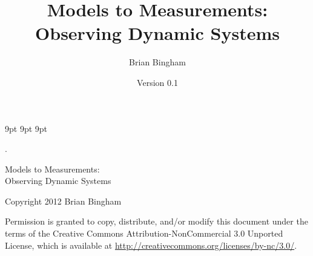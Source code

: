 \documentclass[11pt]{book}
\begin{document}
\graphicspath{{./}{./figs/}}

%

\newcommand{\bmcode}{\begin{lstlisting}[style=myMatStyle]}
\newcommand{\emcode}{\end{lstlisting}}

\newcommand{\SF}{0.2}
\newcommand{\SFb}{0.3}

\newcommand{\FigWidth}{0.7}
\newcommand{\ThisFigWidth}{0.7}

\newcommand{\scaleOneTwo}[2] {\scalebox{#2}}

\graphicspath{{./figs/}}


     {9pt}%
     {9pt}%
     {\itshape}%
     {}%
     {\bfseries}%
     {}%
     {9pt}%
     {}%


\theoremstyle{myex}
\newtheorem{ex}{Exercise}[chapter]



\frontmatter
\newcommand{\thetitle}{Models to Measurements: \\Observing Dynamic Systems}
\title{\thetitle}
\author{Brian Bingham}
\date{Version 0.1}

\maketitle
.
\vspace{2in} %
 
\begin{center}
{\Large \thetitle}
\vspace{0.5in}

Copyright 2012 Brian Bingham
\end{center}

Permission is granted to copy, distribute, and/or modify this document
under the terms of the Creative Commons Attribution-NonCommercial 3.0 Unported
License, which is available at \url{http://creativecommons.org/licenses/by-nc/3.0/}.
\end{document}
